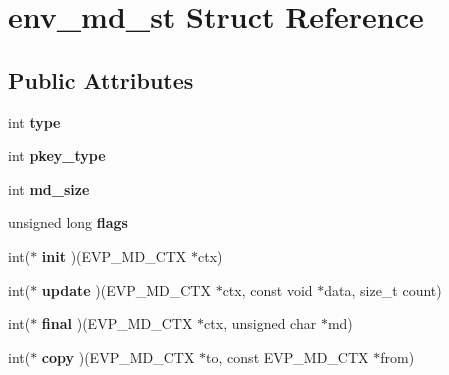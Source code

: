 \hypertarget{structenv__md__st}{}\section{env\+\_\+md\+\_\+st Struct Reference}
\label{structenv__md__st}
\subsection*{Public Attributes}
\begin{DoxyCompactItemize}
\item 
\mbox{\label{structenv__md__st_a23f72d7bf1652d69a85942f66f55df01}} 
int {\bfseries type}
\item 
\mbox{\label{structenv__md__st_a30d9b3466b50542b6931476f0ecf2351}} 
int {\bfseries pkey\+\_\+type}
\item 
\mbox{\label{structenv__md__st_a7de9719a79492ba980f18f546ff160cf}} 
int {\bfseries md\+\_\+size}
\item 
\mbox{\label{structenv__md__st_a5096c8e255bb2b2100aeae4d50af2fcb}} 
unsigned long {\bfseries flags}
\item 
\mbox{\label{structenv__md__st_afe1f83efe755ab7f5887ff46aa1269be}} 
int($\ast$ {\bfseries init} )(E\+V\+P\+\_\+\+M\+D\+\_\+\+C\+TX $\ast$ctx)
\item 
\mbox{\label{structenv__md__st_a57339bd5446e71a0a827f12d8ba23e40}} 
int($\ast$ {\bfseries update} )(E\+V\+P\+\_\+\+M\+D\+\_\+\+C\+TX $\ast$ctx, const void $\ast$data, size\+\_\+t count)
\item 
\mbox{\label{structenv__md__st_aa04a65c96264e232f926f2ddf03a5fd3}} 
int($\ast$ {\bfseries final} )(E\+V\+P\+\_\+\+M\+D\+\_\+\+C\+TX $\ast$ctx, unsigned char $\ast$md)
\item 
\mbox{\label{structenv__md__st_ac616c2dbbb6a5b70cca668db44500840}} 
int($\ast$ {\bfseries copy} )(E\+V\+P\+\_\+\+M\+D\+\_\+\+C\+TX $\ast$to, const E\+V\+P\+\_\+\+M\+D\+\_\+\+C\+TX $\ast$from)
\item 
\mbox{\label{structenv__md__st_acf24becb13e74703b0995ab0f310dc69}} 

\end{DoxyCompactItemize}
